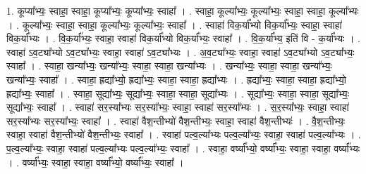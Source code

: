 \documentclass[17pt]{extarticle}
\begin{document}
1. कूप्या᳚भ्यः॒ स्वाहा॒ स्वाहा॒ कूप्या᳚भ्यः॒ कूप्या᳚भ्यः॒ स्वाहा᳚ । . स्वाहा॒ कूल्या᳚भ्यः॒ कूल्या᳚भ्यः॒ स्वाहा॒ स्वाहा॒ कूल्या᳚भ्यः । . कूल्या᳚भ्यः॒ स्वाहा॒ स्वाहा॒ कूल्या᳚भ्यः॒ कूल्या᳚भ्यः॒ स्वाहा᳚ । . स्वाहा॑ विक॒र्या᳚भ्यो विक॒र्या᳚भ्यः॒ स्वाहा॒ स्वाहा॑ विक॒र्या᳚भ्यः । . वि॒क॒र्या᳚भ्यः॒ स्वाहा॒ स्वाहा॑ विक॒र्या᳚भ्यो विक॒र्या᳚भ्यः॒ स्वाहा᳚ । . वि॒क॒र्या᳚भ्य॒ इति॑ वि - क॒र्या᳚भ्यः । . स्वाहा॑ ऽव॒ट्या᳚भ्यो ऽव॒ट्या᳚भ्यः॒ स्वाहा॒ स्वाहा॑ ऽव॒ट्या᳚भ्यः । . अ॒व॒ट्या᳚भ्यः॒ स्वाहा॒ स्वाहा॑ ऽव॒ट्या᳚भ्यो ऽव॒ट्या᳚भ्यः॒ स्वाहा᳚ । . स्वाहा॒ खन्या᳚भ्यः॒ खन्या᳚भ्यः॒ स्वाहा॒ स्वाहा॒ खन्या᳚भ्यः । . खन्या᳚भ्यः॒ स्वाहा॒ स्वाहा॒ खन्या᳚भ्यः॒ खन्या᳚भ्यः॒ स्वाहा᳚ । . स्वाहा॒ ह्रद्या᳚भ्यो॒ ह्रद्या᳚भ्यः॒ स्वाहा॒ स्वाहा॒ ह्रद्या᳚भ्यः । . ह्रद्या᳚भ्यः॒ स्वाहा॒ स्वाहा॒ ह्रद्या᳚भ्यो॒ ह्रद्या᳚भ्यः॒ स्वाहा᳚ । . स्वाहा॒ सूद्या᳚भ्यः॒ सूद्या᳚भ्यः॒ स्वाहा॒ स्वाहा॒ सूद्या᳚भ्यः । . सूद्या᳚भ्यः॒ स्वाहा॒ स्वाहा॒ सूद्या᳚भ्यः॒ सूद्या᳚भ्यः॒ स्वाहा᳚ । . स्वाहा॑ सर॒स्या᳚भ्यः सर॒स्या᳚भ्यः॒ स्वाहा॒ स्वाहा॑ सर॒स्या᳚भ्यः । . स॒र॒स्या᳚भ्यः॒ स्वाहा॒ स्वाहा॑ सर॒स्या᳚भ्यः सर॒स्या᳚भ्यः॒ स्वाहा᳚ । . स्वाहा॑ वैश॒न्तीभ्यो॑ वैश॒न्तीभ्यः॒ स्वाहा॒ स्वाहा॑ वैश॒न्तीभ्यः॑ । . वै॒श॒न्तीभ्यः॒ स्वाहा॒ स्वाहा॑ वैश॒न्तीभ्यो॑ वैश॒न्तीभ्यः॒ स्वाहा᳚ । . स्वाहा॑ पल्व॒ल्या᳚भ्यः पल्व॒ल्या᳚भ्यः॒ स्वाहा॒ स्वाहा॑ पल्व॒ल्या᳚भ्यः । . प॒ल्व॒ल्या᳚भ्यः॒ स्वाहा॒ स्वाहा॑ पल्व॒ल्या᳚भ्यः पल्व॒ल्या᳚भ्यः॒ स्वाहा᳚ । . स्वाहा॒ वर्ष्या᳚भ्यो॒ वर्ष्या᳚भ्यः॒ स्वाहा॒ स्वाहा॒ वर्ष्या᳚भ्यः । . वर्ष्या᳚भ्यः॒ स्वाहा॒ स्वाहा॒ वर्ष्या᳚भ्यो॒ वर्ष्या᳚भ्यः॒ स्वाहा᳚ । \newline
\end{document}
